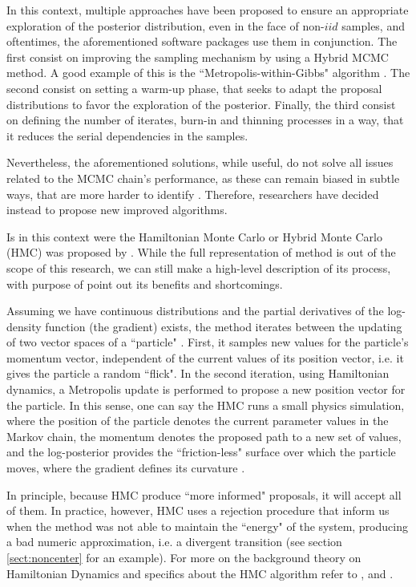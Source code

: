 In this context, multiple approaches have been proposed to ensure an appropriate exploration of the posterior distribution, even in the face of non-$iid$ samples, and oftentimes, the aforementioned software packages use them in conjunction. The first consist on improving the sampling mechanism by using a Hybrid MCMC method. A good example of this is the ``Metropolis-within-Gibbs" algorithm \cite{Muller_1991}. The second consist on setting a warm-up phase, that seeks to adapt the proposal distributions to favor the exploration of the posterior. Finally, the third consist on defining the number of iterates, burn-in and thinning processes in a way, that it reduces the serial dependencies in the samples. 

Nevertheless, the aforementioned solutions, while useful, do not solve all issues related to the MCMC chain's performance, as these can remain biased in subtle ways, that are more harder to identify \cite{McElreath_2020}. Therefore, researchers have decided instead to propose new improved algorithms. 

Is in this context were the Hamiltonian Monte Carlo or Hybrid Monte Carlo (HMC) was proposed by \citet{Duane_et_al_1987}. While the full representation of method is out of the scope of this research, we can still make a high-level description of its process, with purpose of point out its benefits and shortcomings. 

Assuming we have continuous distributions and the partial derivatives of the log-density function (the gradient) exists, the method iterates between the updating of two vector spaces of a ``particle" \cite{Neal_2011, McElreath_2020}. First, it samples new values for the particle's momentum vector, independent of the current values of its position vector, i.e. it gives the particle a random ``flick". In the second iteration, using Hamiltonian dynamics, a Metropolis update is performed to propose a new position vector for the particle. In this sense, one can say the HMC runs a small physics simulation, where the position of the particle denotes the current parameter values in the Markov chain, the momentum denotes the proposed path to a new set of values, and the log-posterior provides the ``friction-less" surface over which the particle moves, where the gradient defines its curvature \cite{McElreath_2020}.

In principle, because HMC produce ``more informed" proposals, it will accept all of them. In practice, however, HMC uses a rejection procedure that inform us when the method was not able to maintain the ``energy" of the system, producing a bad numeric approximation, i.e. a divergent transition (see section \ref{sect:noncenter} for an example). For more on the background theory on Hamiltonian Dynamics and specifics about the HMC algorithm refer to \citet{Neal_2011}, and \citet{Betancourt_et_al_2013}.

